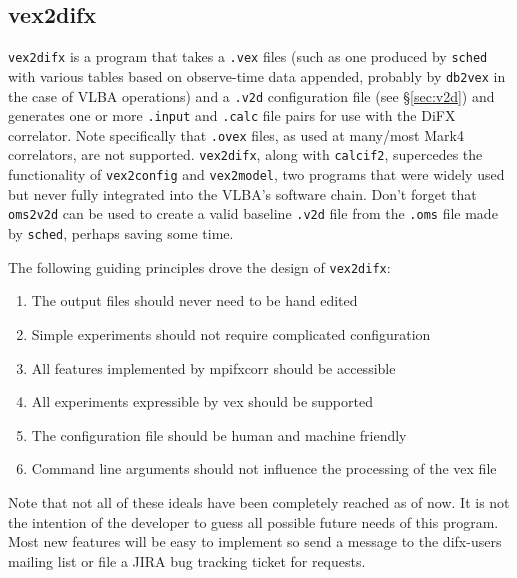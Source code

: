 
\subsection{vex2difx} \label{sec:vex2difx}

{\tt vex2difx} is a program that takes a {\tt .vex} files (such as one produced by {\tt sched} with various tables based on observe-time data appended, probably by {\tt db2vex} in the case of VLBA operations) and a {\tt .v2d} configuration file (see \S\ref{sec:v2d}) and generates one or more {\tt .input} and {\tt .calc} file pairs for use with the DiFX correlator. 
Note specifically that {\tt .ovex} files, as used at many/most Mark4 correlators, are not supported.
{\tt vex2difx}, along with {\tt calcif2}, supercedes the functionality of {\tt vex2config} and {\tt vex2model}, two programs that were widely used but never fully integrated into the VLBA's software chain. 
Don't forget that {\tt oms2v2d} can be used to create a valid baseline {\tt .v2d} file from the {\tt .oms} file made by {\tt sched}, perhaps saving some time.

The following guiding principles drove the design of {\tt vex2difx}:
\begin{enumerate}
  \item The output files should never need to be hand edited
  \item Simple experiments should not require complicated configuration
  \item All features implemented by mpifxcorr should be accessible
  \item All experiments expressible by vex should be supported
  \item The configuration file should be human and machine friendly
  \item Command line arguments should not influence the processing of the vex file
\end{enumerate}
Note that not all of these ideals have been completely reached as of now. It is not the intention of the developer to guess all possible future needs of this program. 
Most new features will be easy to implement so send a message to the difx-users mailing list or file a JIRA \cite{jira} bug tracking ticket for requests.

